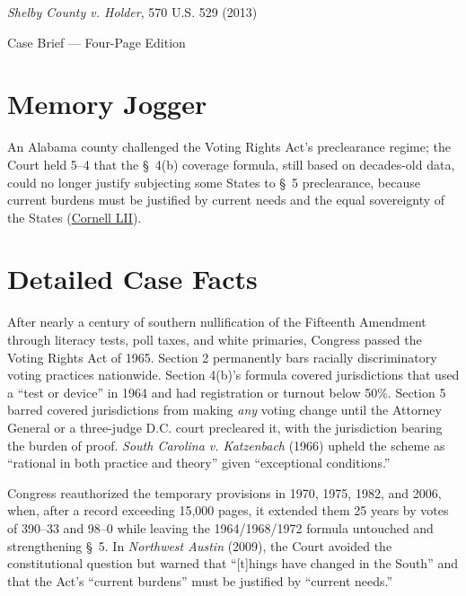 \documentclass[12pt]{article}
\begin{document}
\begin{center}
{\LARGE \textit{Shelby County v. Holder}, 570 U.S. 529 (2013)\par}
\vspace{0.8em}
{\large Case Brief --- Four-Page Edition\par}
\end{center}
\vspace{1em}

\section{Memory Jogger}

An Alabama county challenged the Voting Rights Act's preclearance regime; the Court held 5--4 that the \S~4(b) coverage formula, still based on decades-old data, could no longer justify subjecting some States to \S~5 preclearance, because current burdens must be justified by current needs and the equal sovereignty of the States (\href{https://www.law.cornell.edu/supremecourt/text/12-96}{Cornell LII}).

\section{Detailed Case Facts}

After nearly a century of southern nullification of the Fifteenth Amendment through literacy tests, poll taxes, and white primaries, Congress passed the Voting Rights Act of 1965. Section 2 permanently bars racially discriminatory voting practices nationwide. Section 4(b)'s formula covered jurisdictions that used a ``test or device'' in 1964 and had registration or turnout below 50\%. Section 5 barred covered jurisdictions from making \emph{any} voting change until the Attorney General or a three-judge D.C. court precleared it, with the jurisdiction bearing the burden of proof. \textit{South Carolina v. Katzenbach} (1966) upheld the scheme as ``rational in both practice and theory'' given ``exceptional conditions.''

Congress reauthorized the temporary provisions in 1970, 1975, 1982, and 2006, when, after a record exceeding 15,000 pages, it extended them 25 years by votes of 390--33 and 98--0 while leaving the 1964/1968/1972 formula untouched and strengthening \S~5. In \textit{Northwest Austin} (2009), the Court avoided the constitutional question but warned that ``[t]hings have changed in the South'' and that the Act's ``current burdens'' must be justified by ``current needs.''
\end{document}
